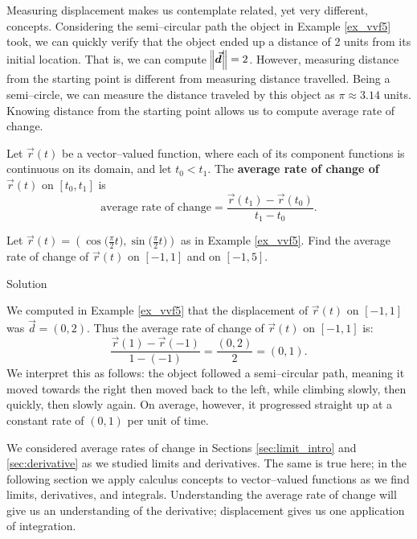 Measuring displacement makes us contemplate related, yet very different, concepts. Considering the semi--circular path the object in Example \ref{ex_vvf5} took, we can quickly verify that the object ended up a distance of 2 units from its initial location. That is, we can compute $\vnorm{d} = 2$. However, measuring distance from the starting point is different from measuring distance travelled. Being a semi--circle, we can measure the distance traveled by this object as $\pi\approx 3.14$ units. Knowing distance from the starting point allows us to compute average rate of change.

\begin{definition}\label{def:av_rate_of_change_vect}
Let $\vec r(t)$ be a vector--valued function, where each of its component functions is continuous on its domain, and let $t_0<t_1$. The \textbf{average rate of change of} $\vec r(t)$ on $[t_0,t_1]$ is
$$\text{average rate of change} = \frac{\vec r(t_1) - \vec r(t_0)}{t_1-t_0}.$$
\end{definition}

\begin{example}\label{ex_vvf6}
Let $\vec r(t) = \left( \cos\big(\frac{\pi}2t\big),\sin\big(\frac{\pi}2t\big)\right)$ as in Example \ref{ex_vvf5}. Find the average rate of change of $\vec r(t)$ on $[-1,1]$ and on $[-1,5]$.

Solution 

We computed in Example \ref{ex_vvf5} that the displacement of $\vec r(t)$ on $[-1,1]$ was $\vec d = \left( 0,2\right)$. Thus the average rate of change of $\vec r(t)$ on $[-1,1]$ is:
$$\frac{\vec r(1) -\vec r(-1)}{1-(-1)} = \frac{\left( 0,2\right)}{2} = \left( 0,1\right).$$
We interpret this as follows: the object followed a semi--circular path, meaning it moved towards the right then moved back to the left, while climbing slowly, then quickly, then slowly again. On average, however, it progressed straight up at a constant rate of $\left( 0,1\right)$ per unit of time.
\end{example}

We considered average rates of change in Sections \ref{sec:limit_intro} and \ref{sec:derivative} as we studied limits and derivatives. The same is true here; in the following section we apply calculus concepts to vector--valued functions as we find limits, derivatives, and integrals. Understanding the average rate of change will give us an understanding of the derivative; displacement gives us one application of integration.

